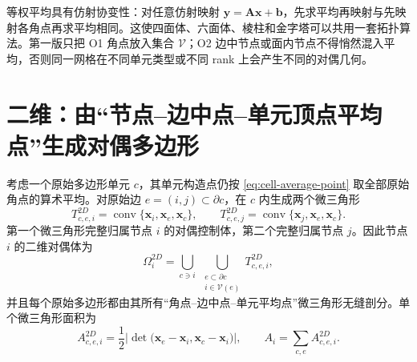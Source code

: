 \documentclass[UTF8,a4paper,11pt,openany]{ctexrep}
\numberwithin{equation}{chapter}
\begin{document}
等权平均具有仿射协变性：对任意仿射映射 $\bm y=\bm A\bm x+\bm b$，先求平均再映射与先映射各角点再求平均相同。这使四面体、六面体、棱柱和金字塔可以共用一套拓扑算法。第一版只把 O1 角点放入集合 $\mathcal V$；O2 边中节点或面内节点不得悄然混入平均，否则同一网格在不同单元类型或不同 rank 上会产生不同的对偶几何。

\section{二维：由“节点--边中点--单元顶点平均点”生成对偶多边形}

考虑一个原始多边形单元 $c$，其单元构造点仍按 \cref{eq:cell-average-point} 取全部原始角点的算术平均。对原始边 $e=(i,j)\subset\partial c$，在 $c$ 内生成两个微三角形
\begin{equation}
  T^{2D}_{c,e,i}=\operatorname{conv}\{\bm x_i,\bm x_e,\bm x_c\},
  \qquad
  T^{2D}_{c,e,j}=\operatorname{conv}\{\bm x_j,\bm x_e,\bm x_c\}.
  \label{eq:dual-2d-microtriangle}
\end{equation}
第一个微三角形完整归属节点 $i$ 的对偶控制体，第二个完整归属节点 $j$。因此节点 $i$ 的二维对偶体为
\begin{equation}
  \Omega_i^{2D}
  =\bigcup_{c\ni i}\ \bigcup_{\substack{e\subset\partial c\\i\in\mathcal V(e)}}
   T^{2D}_{c,e,i},
  \label{eq:dual-2d-cell}
\end{equation}
并且每个原始多边形都由其所有“角点--边中点--单元平均点”微三角形无缝剖分。单个微三角形面积为
\begin{equation}
  A^{2D}_{c,e,i}
  =\frac12\left|
    \det\big(\bm x_e-\bm x_i,\bm x_c-\bm x_i\big)
  \right|,
  \qquad
  A_i=\sum_{c,e}A^{2D}_{c,e,i}.
\end{equation}
\end{document}
